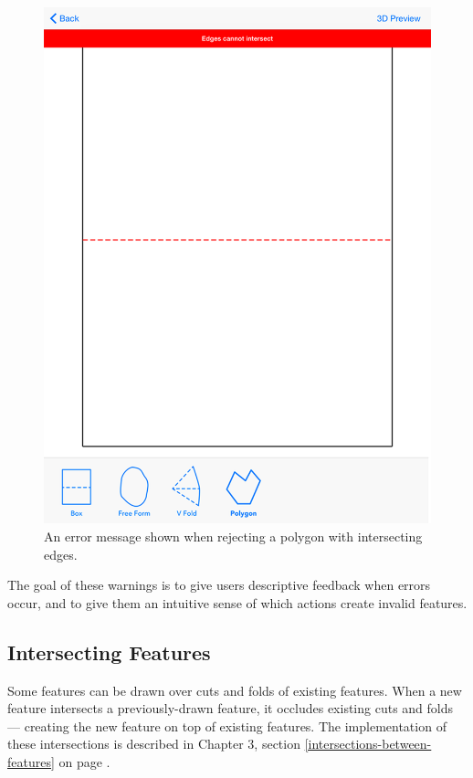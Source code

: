 \begin{figure}[htbp]
\centering
\includegraphics{figures/32_UI_Tool_Interactions/error_message.png}
\caption{An error message shown when rejecting a polygon with
intersecting edges.}
\end{figure}

The goal of these warnings is to give users descriptive feedback when
errors occur, and to give them an intuitive sense of which actions
create invalid features.

\subsection{Intersecting Features}\label{intersecting-features}

Some features can be drawn over cuts and folds of existing features.
When a new feature intersects a previously-drawn feature, it occludes
existing cuts and folds --- creating the new feature on top of existing
features. The implementation of these intersections is described in
Chapter 3, section \ref{intersections-between-features} on page
\pageref{intersections-between-features}.

